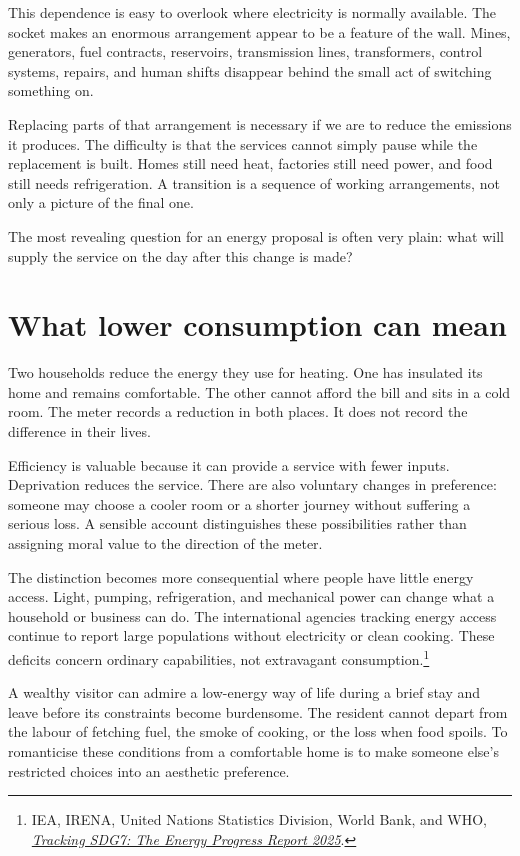 \documentclass[12pt,a4paper]{book}
\begin{document}
This dependence is easy to overlook where electricity is normally available. The socket makes an enormous arrangement appear to be a feature of the wall. Mines, generators, fuel contracts, reservoirs, transmission lines, transformers, control systems, repairs, and human shifts disappear behind the small act of switching something on.

Replacing parts of that arrangement is necessary if we are to reduce the emissions it produces. The difficulty is that the services cannot simply pause while the replacement is built. Homes still need heat, factories still need power, and food still needs refrigeration. A transition is a sequence of working arrangements, not only a picture of the final one.

The most revealing question for an energy proposal is often very plain: what will supply the service on the day after this change is made?

\section*{What lower consumption can mean}

Two households reduce the energy they use for heating. One has insulated its home and remains comfortable. The other cannot afford the bill and sits in a cold room. The meter records a reduction in both places. It does not record the difference in their lives.

Efficiency is valuable because it can provide a service with fewer inputs. Deprivation reduces the service. There are also voluntary changes in preference: someone may choose a cooler room or a shorter journey without suffering a serious loss. A sensible account distinguishes these possibilities rather than assigning moral value to the direction of the meter.

The distinction becomes more consequential where people have little energy access. Light, pumping, refrigeration, and mechanical power can change what a household or business can do. The international agencies tracking energy access continue to report large populations without electricity or clean cooking. These deficits concern ordinary capabilities, not extravagant consumption.\footnote{IEA, IRENA, United Nations Statistics Division, World Bank, and WHO, \href{https://www.iea.org/reports/tracking-sdg7-the-energy-progress-report-2025}{\emph{Tracking SDG7: The Energy Progress Report 2025}}.}

A wealthy visitor can admire a low-energy way of life during a brief stay and leave before its constraints become burdensome. The resident cannot depart from the labour of fetching fuel, the smoke of cooking, or the loss when food spoils. To romanticise these conditions from a comfortable home is to make someone else's restricted choices into an aesthetic preference.
\end{document}
